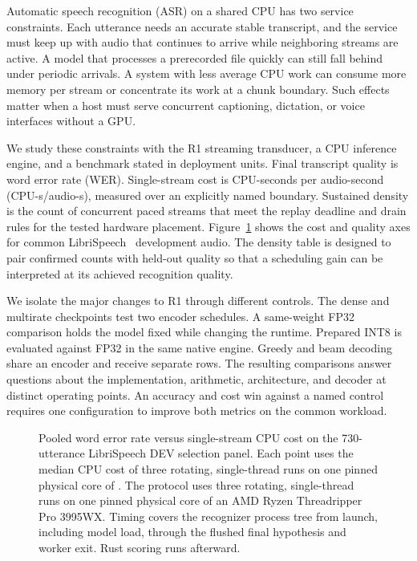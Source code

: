 \documentclass[conference]{IEEEtran}
\newcommand{\cps}{\mbox{CPU-s/audio-s}}
\begin{document}
Automatic speech recognition (ASR) on a shared CPU has two service constraints.
Each utterance needs an accurate stable transcript, and the service must keep
up with audio that continues to arrive while neighboring streams are active.
A model that processes a prerecorded file quickly can still fall behind under
periodic arrivals. A system with less average CPU work can consume more memory
per stream or concentrate its work at a chunk boundary. Such effects matter
when a host must serve concurrent captioning, dictation, or voice interfaces
without a GPU.

We study these constraints with the R1 streaming transducer, a CPU inference
engine, and a benchmark stated in deployment units. Final transcript quality is
word error rate (WER). Single-stream cost is CPU-seconds per audio-second
(\cps), measured over an explicitly named boundary. Sustained density is the
count of concurrent paced streams that meet the replay deadline and drain
rules for the tested hardware placement. Figure~\ref{fig:dev-frontier} shows
the cost and quality axes for common LibriSpeech~\cite{panayotov2015librispeech}
development audio. The density table is designed to pair confirmed counts
with held-out quality so that a scheduling gain can be interpreted at its
achieved recognition quality.

We isolate the major changes to R1 through different controls. The dense and
multirate checkpoints test two encoder schedules. A same-weight FP32 comparison
holds the model fixed while changing the runtime. Prepared INT8 is evaluated
against FP32 in the same native engine. Greedy and beam decoding share an
encoder and receive separate rows. The resulting comparisons answer questions
about the implementation, arithmetic, architecture, and decoder at distinct
operating points. An accuracy and cost win against a named control requires
one configuration to improve both metrics on the common workload.

\begin{figure}[!t]
\centering

\caption{Pooled word error rate versus single-stream CPU cost on the 730-utterance
LibriSpeech DEV selection panel. \ifpapercoldpoints Each point uses the median
CPU cost of three rotating, single-thread runs on one pinned physical core of
\paperhardware. \else The protocol uses three rotating, single-thread runs on
one pinned physical core of an AMD Ryzen Threadripper Pro 3995WX. \fi Timing
covers the recognizer process tree from launch, including model load, through
the flushed final hypothesis and worker exit. Rust scoring runs afterward.}
\label{fig:dev-frontier}
\end{figure}
\end{document}
